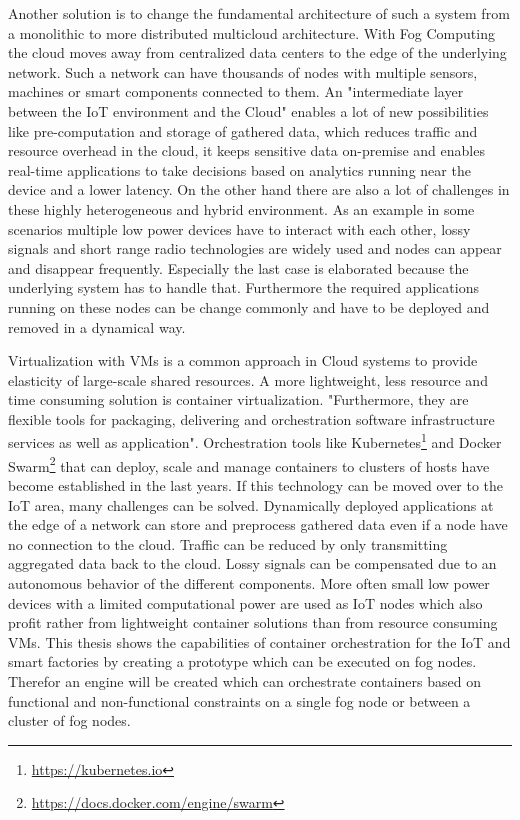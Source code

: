 Another solution is to change the fundamental architecture of such a system from a monolithic to more distributed multicloud architecture.
With Fog Computing the cloud moves away from centralized data centers to the edge of the underlying network.\autocite[cf.][p. 380]{Pahl:2015}
Such a network can have thousands of nodes with multiple sensors, machines or smart components connected to them.
An "intermediate layer between the IoT environment and the Cloud"\autocite[p.236]{Brito:2016} enables a lot of new possibilities like pre-computation and storage of gathered data, which reduces traffic and resource overhead in the cloud, it keeps sensitive data on-premise\autocite[cf.][p.236]{Brito:2016} and enables real-time applications to take decisions based on analytics running near the device and a lower latency.
On the other hand there are also a lot of challenges in these highly heterogeneous and hybrid environment.
As an example in some scenarios multiple low power devices have to interact with each other, lossy signals and short range radio technologies are widely used and nodes can appear and disappear frequently.\autocite[cf.][p. 325]{Yannuzzi:2014}
Especially the last case is elaborated because the underlying system has to handle that.
Furthermore the required applications running on these nodes can be change commonly and have to be deployed and removed in a dynamical way.

Virtualization with \acp{VM} is a common approach in Cloud systems to provide elasticity of large-scale shared resources.\autocite[cf.][p. 117]{Pahl:2016}
A more lightweight, less resource and time consuming solution is container virtualization.
"Furthermore, they are flexible tools for packaging, delivering and orchestration software infrastructure services as well as application"\autocite[p. 117]{Pahl:2016}.
Orchestration tools like Kubernetes\footnote{\url{https://kubernetes.io}} and Docker Swarm\footnote{\url{https://docs.docker.com/engine/swarm}} that can deploy, scale and manage containers to clusters of hosts have become established in the last years.
If this technology can be moved over to the \ac{IoT} area, many challenges can be solved.
Dynamically deployed applications at the edge of a network can store and preprocess gathered data even if a node have no connection to the cloud.
Traffic can be reduced by only transmitting aggregated data back to the cloud.
Lossy signals can be compensated due to an autonomous behavior of the different components.
More often small low power devices with a limited computational power are used as \ac{IoT} nodes which also profit rather from lightweight container solutions than from resource consuming \acp{VM}.
This thesis shows the capabilities of container orchestration for the \ac{IoT} and smart factories by creating a prototype which can be executed on fog nodes.
Therefor an engine will be created which can orchestrate containers based on functional and non-functional constraints on a single fog node or between a cluster of fog nodes.


